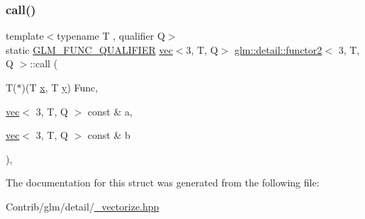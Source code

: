 \subsubsection{\texorpdfstring{call()}{call()}}
{\footnotesize\ttfamily template$<$typename T , qualifier Q$>$ \\
static \mbox{\hyperlink{setup_8hpp_a33fdea6f91c5f834105f7415e2a64407}{G\+L\+M\+\_\+\+F\+U\+N\+C\+\_\+\+Q\+U\+A\+L\+I\+F\+I\+ER}} \mbox{\hyperlink{structglm_1_1vec}{vec}}$<$3, T, Q$>$ \mbox{\hyperlink{structglm_1_1detail_1_1functor2}{glm\+::detail\+::functor2}}$<$ 3, T, Q $>$\+::call (\begin{DoxyParamCaption}\item[{T($\ast$)(T \mbox{\hyperlink{_s_d_l__opengl_8h_ad0e63d0edcdbd3d79554076bf309fd47}{x}}, T \mbox{\hyperlink{_s_d_l__opengl_8h_a1675d9d7bb68e1657ff028643b4037e3}{y}})}]{Func,  }\item[{\mbox{\hyperlink{structglm_1_1vec}{vec}}$<$ 3, T, Q $>$ const \&}]{a,  }\item[{\mbox{\hyperlink{structglm_1_1vec}{vec}}$<$ 3, T, Q $>$ const \&}]{b }\end{DoxyParamCaption})\hspace{0.3cm}{\ttfamily [inline]}, {\ttfamily [static]}}



The documentation for this struct was generated from the following file\+:\begin{DoxyCompactItemize}
\item 
Contrib/glm/detail/\mbox{\hyperlink{__vectorize_8hpp}{\+\_\+vectorize.\+hpp}}\end{DoxyCompactItemize}
